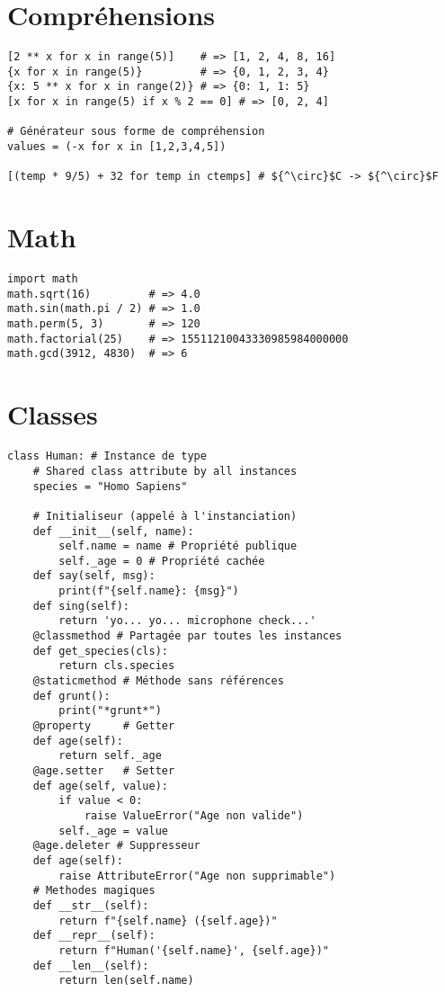 \documentclass{article}
\begin{document}
\begin{multicols*}{4}
\section*{Compréhensions}
\begin{lstlisting}[mathescape]
[2 ** x for x in range(5)]    # => [1, 2, 4, 8, 16]
{x for x in range(5)}         # => {0, 1, 2, 3, 4}
{x: 5 ** x for x in range(2)} # => {0: 1, 1: 5}
[x for x in range(5) if x % 2 == 0] # => [0, 2, 4]

# Générateur sous forme de compréhension      
values = (-x for x in [1,2,3,4,5])

[(temp * 9/5) + 32 for temp in ctemps] # ${^\circ}$C -> ${^\circ}$F
\end{lstlisting}

\section*{Math}
\begin{lstlisting}
import math
math.sqrt(16)         # => 4.0
math.sin(math.pi / 2) # => 1.0
math.perm(5, 3)       # => 120
math.factorial(25)    # => 15511210043330985984000000 
math.gcd(3912, 4830)  # => 6
\end{lstlisting}

\section*{Classes}
\begin{lstlisting}
class Human: # Instance de type 
    # Shared class attribute by all instances
    species = "Homo Sapiens" 

    # Initialiseur (appelé à l'instanciation)
    def __init__(self, name):
        self.name = name # Propriété publique
        self._age = 0 # Propriété cachée
    def say(self, msg):
        print(f"{self.name}: {msg}")
    def sing(self):
        return 'yo... yo... microphone check...'  
    @classmethod # Partagée par toutes les instances
    def get_species(cls):
        return cls.species
    @staticmethod # Méthode sans références
    def grunt():
        print("*grunt*")
    @property     # Getter
    def age(self):
        return self._age
    @age.setter   # Setter 
    def age(self, value):
        if value < 0:
            raise ValueError("Age non valide")
        self._age = value
    @age.deleter # Suppresseur 
    def age(self):
        raise AttributeError("Age non supprimable")
    # Methodes magiques
    def __str__(self):
        return f"{self.name} ({self.age})"
    def __repr__(self):
        return f"Human('{self.name}', {self.age})"
    def __len__(self):
        return len(self.name)


\end{lstlisting}
\end{multicols*}
\end{document}
